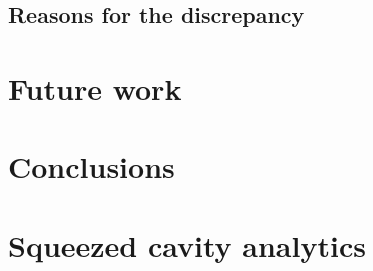 \documentclass[aps,pra,superscriptaddress,reprint,nofootinbib]{revtex4-1}
\begin{document}
\subsection{Reasons for the discrepancy}






\section{Future work}
\label{sec:future_work}



\section{Conclusions}
\label{sec:conclusions}


\begin{acknowledgments}



\end{acknowledgments}


\appendix
\section{Squeezed cavity analytics}
\label{app:squeezed_cavity_analytics}



\nocite{*}


\end{document}
